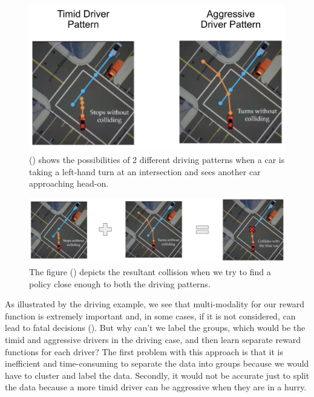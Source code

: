 \documentclass[
  letterpaper,
  DIV=11,
  numbers=noendperiod,
  oneside]{scrreprt}
\theoremstyle{remark}
\begin{document}
\begin{figure}

{\centering \includegraphics{src/Figures/driving-patt.png}

}

\caption{() shows the
possibilities of 2 different driving patterns when a car is taking a
left-hand turn at an intersection and sees another car approaching
head-on.}

\end{figure}%
\begin{figure}

{\centering \includegraphics{src/Figures/driving-coll.png}

}

\caption{The figure ()
depicts the resultant collision when we try to find a policy close
enough to both the driving patterns.}

\end{figure}%

As illustrated by the driving example, we see that multi-modality for
our reward function is extremely important and, in some cases, if it is
not considered, can lead to fatal decisions
(). But why can't we
label the groups, which would be the timid and aggressive drivers in the
driving case, and then learn separate reward functions for each driver?
The first problem with this approach is that it is inefficient and
time-consuming to separate the data into groups because we would have to
cluster and label the data. Secondly, it would not be accurate just to
split the data because a more timid driver can be aggressive when they
are in a hurry.
\end{document}
